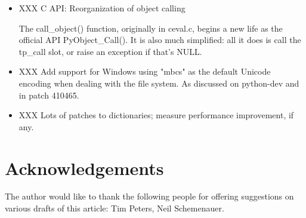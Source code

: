 \documentclass{howto}
\begin{document}
\begin{itemize}
  \item XXX C API: Reorganization of object calling 

The call_object()
function, originally in ceval.c, begins a new life as the official
API PyObject_Call().  It is also much simplified: all it does is call
the tp_call slot, or raise an exception if that's NULL.

 

  \item XXX Add support for Windows using "mbcs" as the default
  Unicode encoding when dealing with the file system.  As discussed on
  python-dev and in patch 410465.

  \item XXX Lots of patches to dictionaries; measure performance improvement, if any.

\end{itemize}



\section{Acknowledgements}

The author would like to thank the following people for offering
suggestions on various drafts of this article: Tim Peters, Neil Schemenauer.
\end{document}
